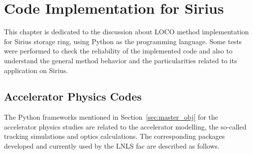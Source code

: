 \chapter{Code Implementation for Sirius}\label{chap:code_studies}
This chapter is dedicated to the discussion about LOCO method implementation for Sirius storage ring, using Python as the programming language. Some tests were performed to check the reliability of the implemented code and also to understand the general method behavior and the particularities related to its application on Sirius.

\section{Accelerator Physics Codes}
The Python frameworks mentioned in Section~\ref{sec:master_obj} for the accelerator physics studies are related to the accelerator modelling, the so-called tracking simulations and optics calculations. The corresponding packages developed and currently used by the LNLS \gls{fac} are described as follows.

